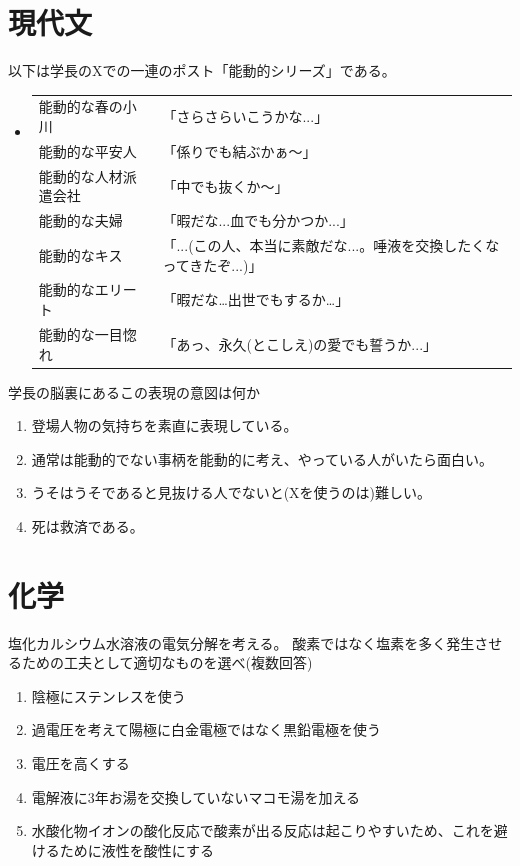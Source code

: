 \documentclass{ltjsarticle}
\begin{document}
\section{現代文}
以下は学長のXでの一連のポスト「能動的シリーズ」である。
\begin{itemize}[label={}]
  \item \begin{tabular}{ll}
    能動的な春の小川   & 「さらさらいこうかな...」                                          \\
    能動的な平安人     & 「係りでも結ぶかぁ～」                                              \\
    能動的な人材派遣会社 & 「中でも抜くか〜」                                                 \\
    能動的な夫婦      & 「暇だな...血でも分かつか...」                                       \\
    能動的なキス      & 「...(この人、本当に素敵だな...。唾液を交換したくなってきたぞ...)」 \\
    能動的なエリート   & 「暇だな…出世でもするか…」                                          \\
    能動的な一目惚れ   & 「あっ、永久(とこしえ)の愛でも誓うか...」                            \\
  \end{tabular}
\end{itemize}
学長の脳裏にあるこの表現の意図は何か
\begin{enumerate}
  \item 登場人物の気持ちを素直に表現している。
  \item 通常は能動的でない事柄を能動的に考え、やっている人がいたら面白い。
  \item うそはうそであると見抜ける人でないと(Xを使うのは)難しい。
  \item 死は救済である。
\end{enumerate}

\section{化学}
塩化カルシウム水溶液の電気分解を考える。
酸素ではなく塩素を多く発生させるための工夫として適切なものを選べ(複数回答)
\begin{enumerate}
  \item 陰極にステンレスを使う
  \item 過電圧を考えて陽極に白金電極ではなく黒鉛電極を使う
  \item 電圧を高くする
  \item 電解液に3年お湯を交換していないマコモ湯を加える
  \item 水酸化物イオンの酸化反応で酸素が出る反応は起こりやすいため、これを避けるために液性を酸性にする
\end{enumerate}
\end{document}
